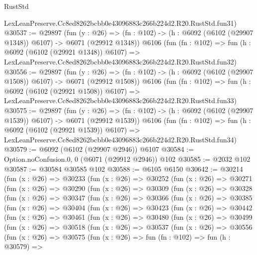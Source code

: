 \begin{lexlean}{RustStd}
\begin{coremodule}
    LexLeanPreserve.Cc8ed8262bcbb0e43096883c266b224d2.R20.RustStd.fun31)
@30537 := @29897
    (fun (y : @26) =>
    (fn : @102) -> (h : @6092 (@6102 (@29907 @1348)) @6107) -> @6071 (@29912 @1348))
    @6106
    (fun (fn : @102) =>
    fun (h : @6092 (@6102 (@29921 @1348)) @6107) =>
    LexLeanPreserve.Cc8ed8262bcbb0e43096883c266b224d2.R20.RustStd.fun32)
@30556 := @29897
    (fun (y : @26) =>
    (fn : @102) -> (h : @6092 (@6102 (@29907 @1508)) @6107) -> @6071 (@29912 @1508))
    @6106
    (fun (fn : @102) =>
    fun (h : @6092 (@6102 (@29921 @1508)) @6107) =>
    LexLeanPreserve.Cc8ed8262bcbb0e43096883c266b224d2.R20.RustStd.fun33)
@30575 := @29897
    (fun (y : @26) =>
    (fn : @102) -> (h : @6092 (@6102 (@29907 @1539)) @6107) -> @6071 (@29912 @1539))
    @6106
    (fun (fn : @102) =>
    fun (h : @6092 (@6102 (@29921 @1539)) @6107) =>
    LexLeanPreserve.Cc8ed8262bcbb0e43096883c266b224d2.R20.RustStd.fun34)
@30579 := @6092 (@6102 (@29907 @2946)) @6107
@30584 := Option.noConfusion.{0, 0} (@6071 (@29912 @2946)) @102
@30585 := @2032 @102
@30587 := @30584 @30585 @102
@30588 := @6105 @6150
@30642 := @30214
    (fun (x : @26) =>
    @30233
      (fun (x : @26) =>
      @30252
        (fun (x : @26) =>
        @30271
          (fun (x : @26) =>
          @30290
            (fun (x : @26) =>
            @30309
              (fun (x : @26) =>
              @30328
                (fun (x : @26) =>
                @30347
                  (fun (x : @26) =>
                  @30366
                    (fun (x : @26) =>
                    @30385
                      (fun (x : @26) =>
                      @30404
                        (fun (x : @26) =>
                        @30423
                          (fun (x : @26) =>
                          @30442
                            (fun (x : @26) =>
                            @30461
                              (fun (x : @26) =>
                              @30480
                                (fun (x : @26) =>
                                @30499
                                  (fun (x : @26) =>
                                  @30518
                                    (fun (x : @26) =>
                                    @30537
                                      (fun (x : @26) =>
                                      @30556
                                        (fun (x : @26) =>
                                        @30575
                                          (fun (x : @26) =>
                                          fun (fn : @102) =>
                                          fun (h : @30579) =>

\end{coremodule}
\end{lexlean}
